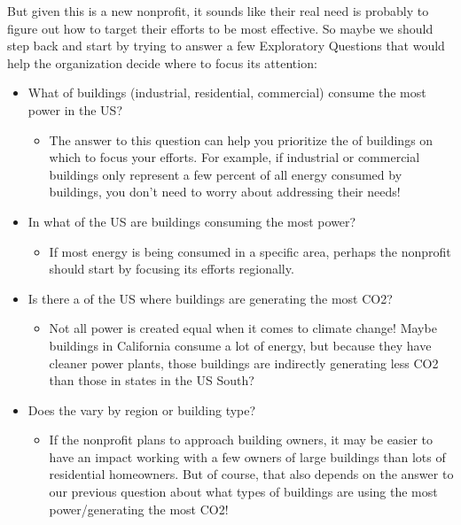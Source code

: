 \documentclass[letterpaper,10pt,english]{jupyterBook}
\begin{document}
\sphinxAtStartPar
But given this is a new non\sphinxhyphen{}profit, it sounds like their real need is probably to figure out how to target their efforts to be most effective. So maybe we should step back and start by trying to answer a few Exploratory Questions that would help the organization decide where to focus its attention:
\begin{itemize}
\item {} 
\sphinxAtStartPar
What  of buildings (industrial, residential, commercial) consume the most power in the US?
\begin{itemize}
\item {} 
\sphinxAtStartPar
The answer to this question can help you prioritize the  of buildings on which to focus your efforts. For example, if industrial or commercial buildings only represent a few percent of all energy consumed by buildings, you don’t need to worry about addressing their needs!

\end{itemize}

\item {} 
\sphinxAtStartPar
In what  of the US are buildings consuming the most power?
\begin{itemize}
\item {} 
\sphinxAtStartPar
If most energy is being consumed in a specific area, perhaps the non\sphinxhyphen{}profit should start by focusing its efforts regionally.

\end{itemize}

\item {} 
\sphinxAtStartPar
Is there a  of the US where buildings are generating the most CO2?
\begin{itemize}
\item {} 
\sphinxAtStartPar
Not all power is created equal when it comes to climate change! Maybe buildings in California consume a lot of energy, but because they have cleaner power plants, those buildings are indirectly generating less CO2 than those in states in the US South?

\end{itemize}

\item {} 
\sphinxAtStartPar
Does the  vary by region or building type?
\begin{itemize}
\item {} 
\sphinxAtStartPar
If the non\sphinxhyphen{}profit plans to approach building owners, it may be easier to have an impact working with a few owners of large buildings than lots of residential homeowners. But of course, that also depends on the answer to our previous question about what types of buildings are using the most power/generating the most CO2!


\end{itemize}
\end{itemize}
\end{document}
